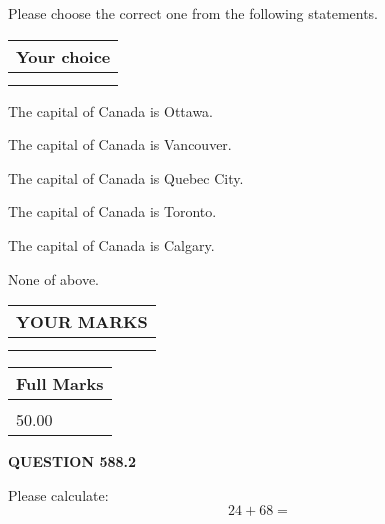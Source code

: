 \documentclass[12pt]{article}
\begin{document}
  
Please choose the correct one from the following statements.
  
  
\noindent\hspace{3.0in} \begin{tabular}{|l|}
\hline
Your choice \\
\hline
 \\ 
 \\ 
\hline
\end{tabular}
  
  
 
 
The capital of Canada is Ottawa.
 
 
The capital of Canada is Vancouver.
 
 
The capital of Canada is Quebec City.
 
 
The capital of Canada is Toronto.
 
 
The capital of Canada is Calgary.
 
 
 None of above.
 
 
  
\vspace{0.2in}
  
\noindent\begin{tabular}{|l|}
\hline
 YOUR MARKS  \\
\hline
 \\ 
 \\ 
\hline
\end{tabular}
\hspace{0.05in} \begin{tabular}{|l|}
\hline
 Full Marks  \\
\hline
 \\ 
50.00 \\
\hline
\end{tabular}
{\textbf{\Large{QUESTION
588.2 
}}}
  
  
 
Please calculate:
\begin{equation}
24 +  %
68 = \nonumber
\end{equation}
 

 

 
   
   
 \vspace{0.2in}
 
   
   
   
   
\end{document}
